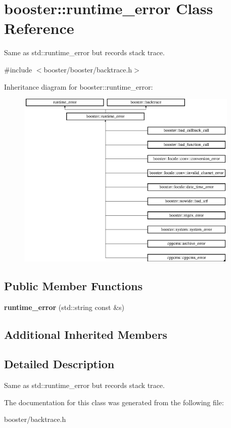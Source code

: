 \section{booster\-:\-:runtime\-\_\-error Class Reference}
\label{classbooster_1_1runtime__error}


Same as std\-::runtime\-\_\-error but records stack trace.  




{\ttfamily \#include $<$booster/booster/backtrace.\-h$>$}

Inheritance diagram for booster\-:\-:runtime\-\_\-error\-:\begin{figure}[H]
\begin{center}
\leavevmode
\includegraphics[height=8.484848cm]{classbooster_1_1runtime__error}
\end{center}
\end{figure}
\subsection*{Public Member Functions}
\begin{DoxyCompactItemize}
\item 
{\bfseries runtime\-\_\-error} (std\-::string const \&s)\label{classbooster_1_1runtime__error_a54020944fcbcc8d1a6592900da0d137d}

\end{DoxyCompactItemize}
\subsection*{Additional Inherited Members}


\subsection{Detailed Description}
Same as std\-::runtime\-\_\-error but records stack trace. 

The documentation for this class was generated from the following file\-:\begin{DoxyCompactItemize}
\item 
booster/backtrace.\-h\end{DoxyCompactItemize}
